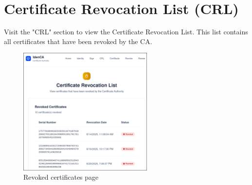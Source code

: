 \section{Certificate Revocation List (CRL)}
Visit the "CRL" section to view the Certificate Revocation List. 
This list contains all certificates that have been revoked by the CA. 
\begin{figure}[h!]
    \centering
    \includegraphics[keepaspectratio, width=0.6\textwidth]{Pic/11_crl.png}
    \caption{Revoked certificates page}
    \label{fig:crl-page}
\end{figure}
